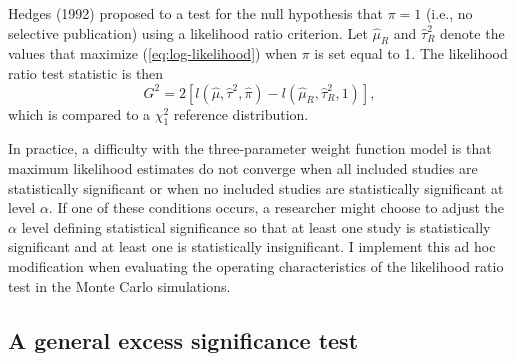 \documentclass[man,floatsintext]{apa6}
\begin{document}
Hedges (1992) proposed to a test for the null hypothesis that \(\pi = 1\) (i.e., no selective publication) using a likelihood ratio criterion.
Let \(\hat\mu_R\) and \(\hat\tau^2_R\) denote the values that maximize (\ref{eq:log-likelihood}) when \(\pi\) is set equal to 1. The likelihood ratio test statistic is then
\begin{equation}
G^2 = 2 \left[l(\hat\mu, \hat\tau^2, \hat\pi) - l(\hat\mu_R, \hat\tau_R^2, 1)\right],
\label{eq:LRT}
\end{equation}
which is compared to a \(\chi^2_1\) reference distribution.

In practice, a difficulty with the three-parameter weight function model is that maximum likelihood estimates do not converge when all included studies are statistically significant or when no included studies are statistically significant at level \(\alpha\).
If one of these conditions occurs, a researcher might choose to adjust the \(\alpha\) level defining statistical significance so that at least one study is statistically significant and at least one is statistically insignificant.
I implement this ad hoc modification when evaluating the operating characteristics of the likelihood ratio test in the Monte Carlo simulations.

\hypertarget{a-general-excess-significance-test}{%
\subsection{A general excess significance test}\label{a-general-excess-significance-test}}
\end{document}
